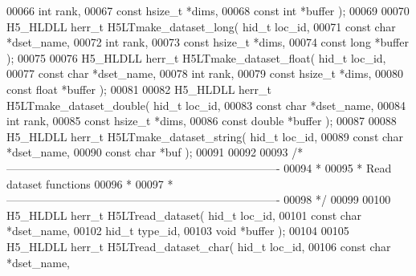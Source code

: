 \begin{DoxyCode}
00066                              \textcolor{keywordtype}{int} rank,
00067                              \textcolor{keyword}{const} hsize\_t *dims,
00068                              \textcolor{keyword}{const} \textcolor{keywordtype}{int} *buffer );
00069 
00070 H5\_HLDLL herr\_t  H5LTmake\_dataset\_long( hid\_t loc\_id,
00071                               \textcolor{keyword}{const} \textcolor{keywordtype}{char} *dset\_name,
00072                               \textcolor{keywordtype}{int} rank,
00073                               \textcolor{keyword}{const} hsize\_t *dims,
00074                               \textcolor{keyword}{const} \textcolor{keywordtype}{long} *buffer );
00075 
00076 H5\_HLDLL herr\_t  H5LTmake\_dataset\_float( hid\_t loc\_id,
00077                                \textcolor{keyword}{const} \textcolor{keywordtype}{char} *dset\_name,
00078                                \textcolor{keywordtype}{int} rank,
00079                                \textcolor{keyword}{const} hsize\_t *dims,
00080                                \textcolor{keyword}{const} \textcolor{keywordtype}{float} *buffer );
00081 
00082 H5\_HLDLL herr\_t  H5LTmake\_dataset\_double( hid\_t loc\_id,
00083                                 \textcolor{keyword}{const} \textcolor{keywordtype}{char} *dset\_name,
00084                                 \textcolor{keywordtype}{int} rank,
00085                                 \textcolor{keyword}{const} hsize\_t *dims,
00086                                 \textcolor{keyword}{const} \textcolor{keywordtype}{double} *buffer );
00087 
00088 H5\_HLDLL herr\_t  H5LTmake\_dataset\_string( hid\_t loc\_id,
00089                                \textcolor{keyword}{const} \textcolor{keywordtype}{char} *dset\_name,
00090                                \textcolor{keyword}{const} \textcolor{keywordtype}{char} *buf );
00091 
00092 
00093 \textcolor{comment}{/*-------------------------------------------------------------------------}
00094 \textcolor{comment}{ *}
00095 \textcolor{comment}{ * Read dataset functions}
00096 \textcolor{comment}{ *}
00097 \textcolor{comment}{ *-------------------------------------------------------------------------}
00098 \textcolor{comment}{ */}
00099 
00100 H5\_HLDLL herr\_t  H5LTread\_dataset( hid\_t loc\_id,
00101                          \textcolor{keyword}{const} \textcolor{keywordtype}{char} *dset\_name,
00102                          hid\_t type\_id,
00103                          \textcolor{keywordtype}{void} *buffer );
00104 
00105 H5\_HLDLL herr\_t  H5LTread\_dataset\_char( hid\_t loc\_id,
00106                               \textcolor{keyword}{const} \textcolor{keywordtype}{char} *dset\_name,

\end{DoxyCode}
